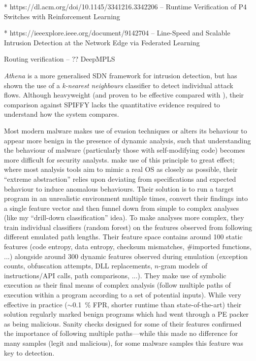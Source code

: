 * https://dl.acm.org/doi/10.1145/3341216.3342206 -- Runtime Verification of P4 Switches with Reinforcement Learning

* https://ieeexplore.ieee.org/document/9142704 -- Line-Speed and Scalable Intrusion Detection at the Network Edge via Federated Learning

Routing verification -- ?? DeepMPLS~\parencite{DBLP:conf/networking/Geyer019}

\emph{Athena} \cite{DBLP:conf/dsn/LeeKSPY17} is a more generalised SDN framework for intrusion detection, but has shown the use of a \emph{k-nearest neighbours} classifier to detect individual attack flows.
Although heavyweight (and proven to be effective compared with \textcite{DBLP:conf/lcn/BragaMP10}), their comparison against SPIFFY lacks the quantitative evidence required to understand how the system compares.

Most modern malware makes use of evasion techniques or alters its behaviour to appear more benign in the presence of dynamic analysis, such that understanding the behaviour of malware (particularly those with self-modifying code) becomes more difficult for security analysts.
\Textcite{DBLP:conf/acsac/CoptyDEEMZ18} make use of this principle to great effect; where most analysis tools aim to mimic a real OS as closely as possible, their ``extreme abstraction'' relies upon deviating from specifications and expected behaviour to induce anomalous behaviours.
Their solution is to run a target program in an unrealistic environment multiple times, convert their findings into a single feature vector and then funnel down from simple to complex analyses (like my ``drill-down classification'' idea).
To make analyses more complex, they train individual classifiers (random forest) on the features observed from following different emulated path lengths.
Their feature space contains around 100 static features (code entropy, data entropy, checksum mismatches, $\#$imported functions, ...) alongside around 300 dynamic features observed during emulation (exception counts, obfuscation attempts, DLL replacements, $n$-gram models of instructions/API calls, path comparisons, ...).
They make use of symbolic execution as their final means of complex analysis (follow multiple paths of execution within a program according to a set of potential inputs).
While very effective in practice ($\sim$\SI{0.1}{\percent} FPR, shorter runtime than state-of-the-art) their solution regularly marked benign programs which had went through a PE packer as being malicious.
Sanity checks designed for some of their features confirmed the importance of following multiple paths---while this made no difference for many samples (legit and malicious), for some malware samples this feature was key to detection.


